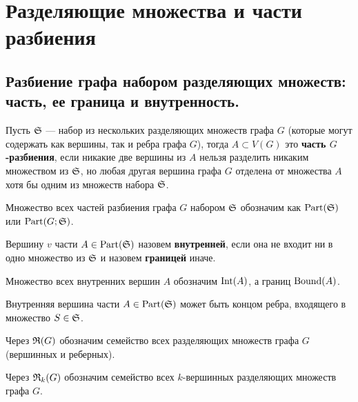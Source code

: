 \setcounter{section}{-1}
\section{Разделяющие множества и части разбиения}

\subsection{Разбиение графа набором разделяющих множеств: часть, ее граница и внутренность.}

\begin{df*}
	Пусть $\S$ — набор из нескольких разделяющих множеств графа $G$ (которые могут содержать как вершины, так и ребра графа $G$), тогда $A \subset V(G)$ это \textbf{часть $G$-разбиения}, если никакие две вершины из $A$ нельзя разделить никаким множеством из $\S$, но любая другая вершина графа $G$ отделена от множества $A$ хотя бы одним из множеств набора $\S$. 
\end{df*}

\begin{prop*}
	Множество всех частей разбиения графа $G$ набором $\S$ обозначим как $\Part(\S)$ или $\Part(G; \S)$.
\end{prop*}

\begin{df*}
	Вершину $v$ части $A \in \Part(\S)$ назовем \textbf{внутренней}, если она не входит ни в одно множество из $\S$ и назовем \textbf{границей} иначе.

	Множество всех внутренних вершин $A$ обозначим $\Int(A)$, а границ $\Bound(A)$.

	Внутренняя вершина части $A \in \Part(\S)$ может быть концом ребра, входящего в множество  $S \in \S$.
\end{df*}

\begin{prop*}
	Через $\R(G)$ обозначим семейство всех разделяющих множеств графа $G$(вершинных и реберных).

	Через $\R_k(G)$ обозначим семейство всех $k$-вершинных разделяющих множеств графа $G$.
\end{prop*}

